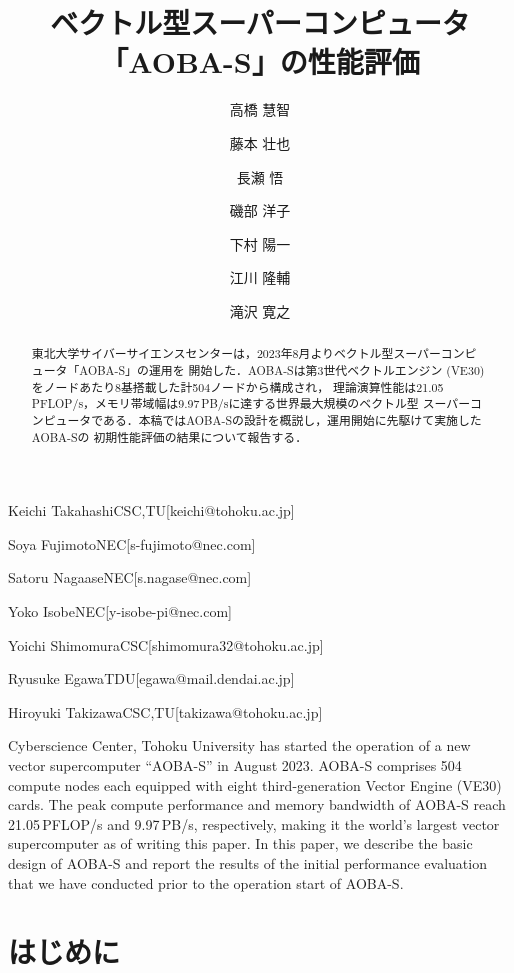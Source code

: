 ﻿\documentclass[submit,techrep,noauthor]{ipsj}
\begin{document}
\title{ベクトル型スーパーコンピュータ「AOBA-S」の性能評価}



\author{高橋 慧智}{Keichi Takahashi}{CSC,TU}[keichi@tohoku.ac.jp]
\author{藤本 壮也}{Soya Fujimoto}{NEC}[s-fujimoto@nec.com]
\author{長瀬 悟}{Satoru Nagaase}{NEC}[s.nagase@nec.com]
\author{磯部 洋子}{Yoko Isobe}{NEC}[y-isobe-pi@nec.com]
\author{下村 陽一}{Yoichi Shimomura}{CSC}[shimomura32@tohoku.ac.jp]
\author{江川 隆輔}{Ryusuke Egawa}{TDU}[egawa@mail.dendai.ac.jp]
\author{滝沢 寛之}{Hiroyuki Takizawa}{CSC,TU}[takizawa@tohoku.ac.jp]

\begin{abstract}
東北大学サイバーサイエンスセンターは，2023年8月よりベクトル型スーパーコンピュータ「AOBA-S」の運用を
開始した．AOBA-Sは第3世代ベクトルエンジン (VE30) をノードあたり8基搭載した計504ノードから構成され，
理論演算性能は21.05\,PFLOP/s，メモリ帯域幅は9.97\,PB/sに達する世界最大規模のベクトル型
スーパーコンピュータである．本稿ではAOBA-Sの設計を概説し，運用開始に先駆けて実施したAOBA-Sの
初期性能評価の結果について報告する．
\end{abstract}

\begin{eabstract}
Cyberscience Center, Tohoku University has started the operation of a new vector supercomputer 
``AOBA-S'' in August 2023. AOBA-S comprises 504 compute nodes each equipped with eight
third-generation Vector Engine (VE30) cards. The peak compute performance and memory bandwidth of
AOBA-S reach 21.05\,PFLOP/s and 9.97\,PB/s, respectively, making it the world's largest vector
supercomputer as of writing this paper. In this paper, we describe the basic design of AOBA-S and
report the results of the initial performance evaluation that we have conducted prior to the
operation start of AOBA-S.
\end{eabstract}

\maketitle

\section{はじめに}
\end{document}
